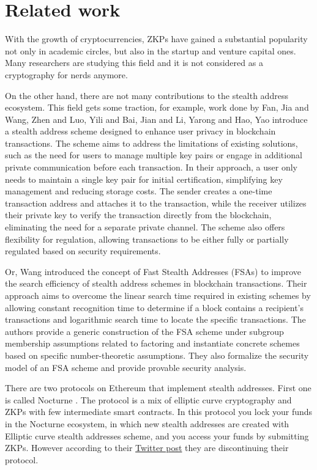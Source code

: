 \chapter{Related work}\label{chapter:related}

With the growth of cryptocurrencies, ZKPs have gained a substantial popularity
not only in academic circles, but also in the startup and venture capital
ones. Many researchers are studying this field and it is not considered 
as a cryptography for nerds anymore. 

On the other hand, there are not many contributions to the stealth address
ecosystem. This field gets some traction, for example, work done by
Fan, Jia and Wang, Zhen and Luo, Yili and Bai, Jian and Li, Yarong and Hao, Yao
\cite{FanJiaWang2019} introduce a stealth address scheme designed to
enhance user privacy in blockchain transactions. The scheme aims to address
the limitations of existing solutions, such as the need for users to manage
multiple key pairs or engage in additional private communication before each
transaction. In their approach, a user only needs to maintain a single key
pair for initial certification, simplifying key management and reducing
storage costs. The sender creates a one-time transaction address and attaches
it to the transaction, while the receiver utilizes their private key to verify
the transaction directly from the blockchain, eliminating the need for a
separate private channel. The scheme also offers flexibility for regulation,
allowing transactions to be either fully or partially regulated based on
security requirements.

Or, Wang \cite{Wang2023} introduced the concept of Fast Stealth Addresses (FSAs)
to improve the search efficiency of stealth address schemes in blockchain transactions.
Their approach aims to overcome the linear search time required in existing schemes
by allowing constant recognition time to determine if a block contains a recipient's
transactions and logarithmic search time to locate the specific transactions.
The authors provide a generic construction of the FSA scheme under subgroup membership
assumptions related to factoring and instantiate concrete schemes based on specific
number-theoretic assumptions. They also formalize the security model of an FSA
scheme and provide provable security analysis.

There are two protocols on Ethereum that implement stealth addresses.
First one is called Nocturne \cite{nocturne}. The protocol is a mix of
elliptic curve cryptography and ZKPs with few intermediate smart contracts.
In this protocol you lock your funds in the Nocturne ecosystem, in which
new stealth addresses are created with Elliptic curve stealth addresses scheme,
and you access your funds by submitting ZKPs. However according to their
\href{https://twitter.com/nocturne_xyz/status/1749510390906511693}{Twitter post}
they are discontinuing their protocol.


